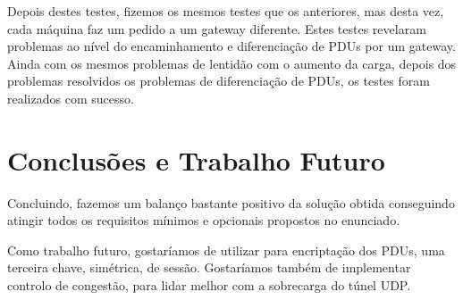 \documentclass[a4paper]{report}
\begin{document}
Depois destes testes, fizemos os mesmos testes que os anteriores, mas desta
vez, cada máquina faz um pedido a um gateway diferente. Estes testes revelaram
problemas ao nível do encaminhamento e diferenciação de PDUs por um gateway.
Ainda com os mesmos problemas de lentidão com o aumento da carga, depois
dos problemas resolvidos os problemas de diferenciação de PDUs, os testes
foram realizados com sucesso.

\chapter{Conclusões e Trabalho Futuro}

Concluindo, fazemos um balanço bastante positivo da solução obtida conseguindo
atingir todos os requisitos mínimos e opcionais propostos no enunciado.

Como trabalho futuro, gostaríamos de utilizar para encriptação dos PDUs,
uma terceira chave, simétrica, de sessão. Gostaríamos também de implementar
controlo de congestão, para lidar melhor com a sobrecarga do túnel UDP. 
\end{document}
